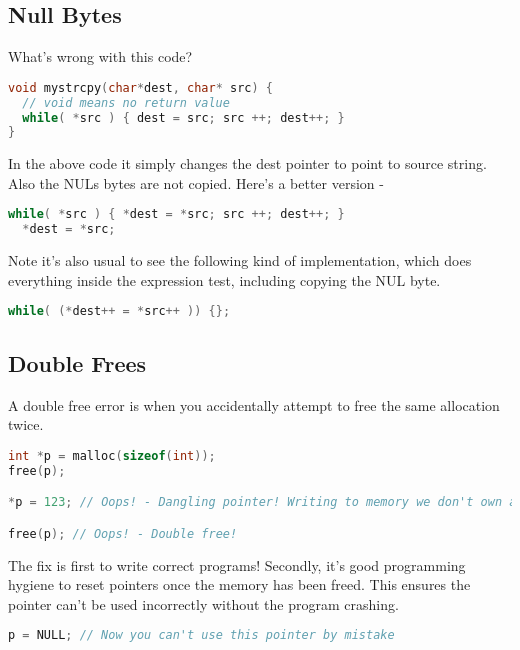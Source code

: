 \subsection{Null Bytes}

What's wrong with this code?

\begin{lstlisting}[language=C]
void mystrcpy(char*dest, char* src) {
  // void means no return value
  while( *src ) { dest = src; src ++; dest++; }
}
\end{lstlisting}

In the above code it simply changes the dest pointer to point to source string. Also the NULs bytes are not copied. Here's a better version -

\begin{lstlisting}[language=C]
  while( *src ) { *dest = *src; src ++; dest++; }
  *dest = *src;
\end{lstlisting}

Note it's also usual to see the following kind of implementation, which does everything inside the expression test, including copying the NUL byte.

\begin{lstlisting}[language=C]
  while( (*dest++ = *src++ )) {};
\end{lstlisting}

\subsection{Double Frees}

A double free error is when you accidentally attempt to free the same allocation twice.

\begin{lstlisting}[language=C]
int *p = malloc(sizeof(int));
free(p);

*p = 123; // Oops! - Dangling pointer! Writing to memory we don't own anymore

free(p); // Oops! - Double free!
\end{lstlisting}

The fix is first to write correct programs!
Secondly, it's good programming hygiene to reset pointers once the memory has been freed.
This ensures the pointer can't be used incorrectly without the program crashing.

\begin{lstlisting}[language=C]
p = NULL; // Now you can't use this pointer by mistake
\end{lstlisting}


